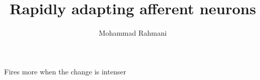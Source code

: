 \documentclass[a4paper]{article}
\title{Rapidly adapting afferent neurons}
\date{}
\author{Mohammad Rahmani}
\begin{document}
    \maketitle
    
    Fires more when the change is intenser
    
    
\end{document}

